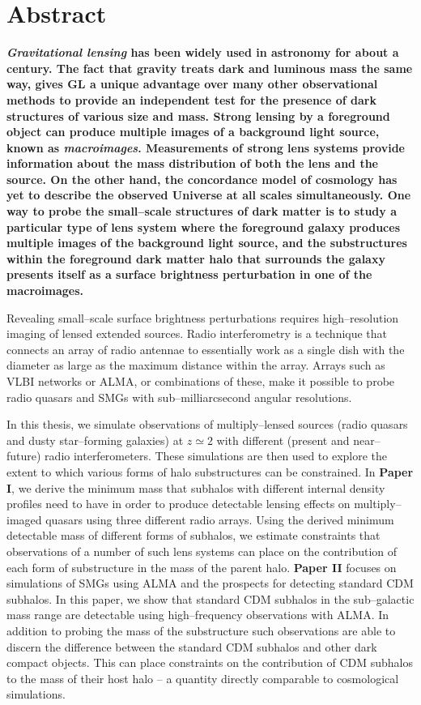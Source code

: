\documentclass[a4wide,12pt]{book}
\newcommand{\ignore}[1]{}
\begin{document}
\clearpage

\chapter*{Abstract}
\thispagestyle{empty}
{\bf \emph{Gravitational lensing} has been widely used in astronomy for about a century. The fact that gravity treats dark and luminous mass the same way, gives GL a unique advantage over many other observational methods to provide an independent test for the presence of dark structures of various size and mass. Strong lensing by a foreground object can produce multiple images of a background light source, known as \emph{macroimages}. Measurements of strong lens systems provide information about the mass distribution of both the lens and the source. On the other hand, the concordance model of cosmology\ignore{ -- accounting for dark matter as the second abundant component in the Universe --} has yet to describe the observed Universe at all scales simultaneously. One way to probe the small--scale structures of dark matter is to study a particular type of lens system where the foreground galaxy produces multiple images of the background light source, and the substructures within the foreground dark matter halo that surrounds the galaxy presents itself as a surface brightness perturbation in one of the macroimages.

Revealing small--scale surface brightness perturbations requires high--resolution imaging of lensed extended sources. Radio interferometry is a technique that connects an array of radio antennae to essentially work as a single dish with the diameter as large as the maximum distance within the array. Arrays such as VLBI networks or ALMA, or combinations of these, make it possible to probe radio quasars and SMGs with sub--milliarcsecond angular resolutions.

In this thesis, we simulate observations of multiply--lensed sources (radio quasars and dusty star--forming galaxies) at $z \simeq 2$ with different (present and near--future) radio interferometers. These simulations are then used to explore the extent to which various forms of halo substructures can be constrained. In {\bf Paper I}, we derive the minimum  mass that subhalos with different internal density profiles need to have in order to produce detectable lensing effects on multiply--imaged quasars using three different radio arrays. Using the derived minimum detectable mass of different forms of subhalos, we estimate constraints that observations of a number of such lens systems can place on the contribution of each form of substructure in the mass of the parent halo. {\bf Paper II} focuses on simulations of SMGs using ALMA and the prospects for detecting standard CDM subhalos. In this paper, we show that standard CDM subhalos in the sub--galactic mass range are detectable using high--frequency observations with ALMA. In addition to probing the mass of the substructure such observations are able to discern the difference between the standard CDM subhalos and other dark compact objects.  This can place constraints on the contribution of CDM subhalos to the mass of their host halo -- a quantity directly comparable to cosmological simulations.}
\end{document}
